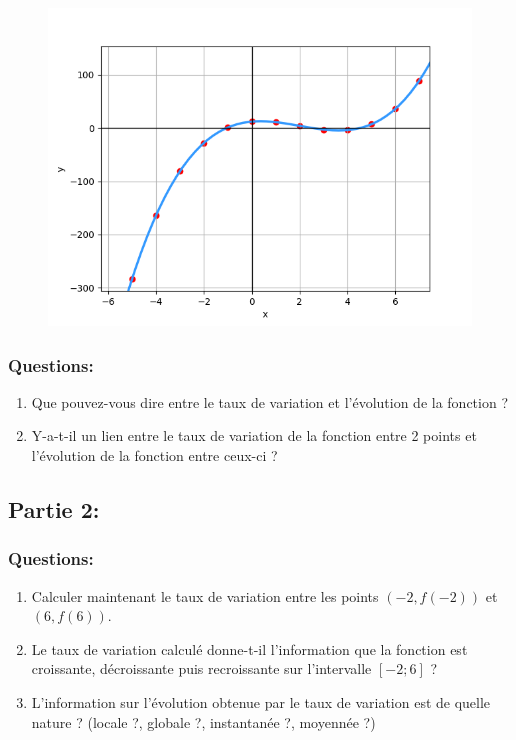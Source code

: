\documentclass[11pt, french]{article}
\begin{document}
\begin{figure}[!h]
\center
\includegraphics[scale=0.8]{assets/serie_5_exo_1_figure_1.png}
\label{fig:p_s_5_exo1-fig1}
\end{figure}

\subsubsection*{Questions:}
\begin{enumerate}
    \item Que pouvez-vous dire entre le taux de variation et l'évolution de la fonction ?
    \item Y-a-t-il un lien entre le taux de variation de la fonction entre 2 points et l'évolution de la fonction entre ceux-ci ? 
\end{enumerate}

\subsection*{Partie 2:}
\subsubsection*{Questions:}
\begin{enumerate}
    \item Calculer maintenant le taux de variation entre les points $(-2, f(-2))$ et $(6,f(6))$.
    \item Le taux de variation calculé donne-t-il l'information que la fonction est croissante, décroissante puis recroissante sur l'intervalle $[-2;6]$ ?
    \item L'information sur l'évolution obtenue par le taux de variation est de quelle nature ? (locale ?, globale ?, instantanée ?, moyennée ?)
\end{enumerate}
\end{document}
